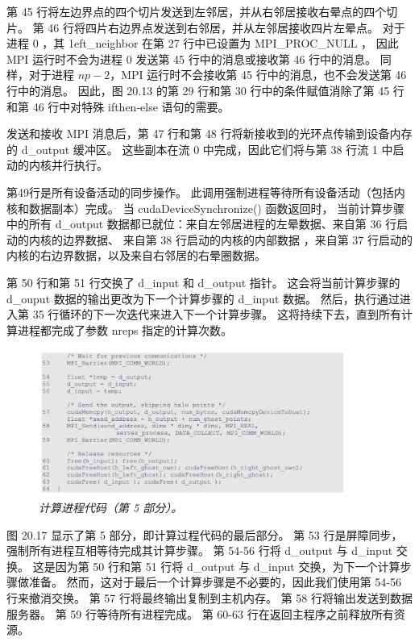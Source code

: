 第 45 行将左边界点的四个切片发送到左邻居，并从右邻居接收右晕点的四个切片。 
第 46 行将四片右边界点发送到右邻居，并从左邻居接收四片左晕点。 
对于进程 0 ，其 1eft\_neighbor 在第 27 行中已设置为 MPI\_PROC\_NULL ，
因此 MPI 运行时不会为进程 0 发送第 45 行中的消息或接收第 46 行中的消息。 
同样，对于进程 $n p-2$，MPI 运行时不会接收第 45 行中的消息，也不会发送第 46 行中的消息。 
因此，图 20.13 的第 29 行和第 30 行中的条件赋值消除了第 45 行和第 46 行中对特殊 ifthen-else 语句的需要。

发送和接收 MPI 消息后，第 47 行和第 48 行将新接收到的光环点传输到设备内存的 d\_output 缓冲区。 
这些副本在流 0 中完成，因此它们将与第 38 行流 1 中启动的内核并行执行。

第49行是所有设备活动的同步操作。 此调用强制进程等待所有设备活动（包括内核和数据副本）完成。 
当 cudaDeviceSynchronize() 函数返回时，
当前计算步骤中的所有 d\_output 数据都已就位：来自左邻居进程的左晕数据、来自第 36 行启动的内核的边界数据、
来自第 38 行启动的内核的内部数据 ，来自第 37 行启动的内核的右边界数据，以及来自右邻居的右晕圈数据。

第 50 行和第 51 行交换了 d\_input 和 d\_output 指针。 
这会将当前计算步骤的 d\_ouput 数据的输出更改为下一个计算步骤的 d\_input 数据。 
然后，执行通过进入第 35 行循环的下一次迭代来进入下一个计算步骤。 
这将持续下去，直到所有计算进程都完成了参数 nreps 指定的计算次数。

\begin{figure}[H]
	\centering
	\includegraphics[width=0.9\textwidth]{figs/F20.17.png}
	\caption{\textit{计算进程代码（第 5 部分）。}}
\end{figure}

图 20.17 显示了第 5 部分，即计算过程代码的最后部分。 第 53 行是屏障同步，强制所有进程互相等待完成其计算步骤。 
第 54-56 行将 d\_output 与 d\_input 交换。 
这是因为第 50 行和第 51 行将 d\_output 与 d\_input 交换，为下一个计算步骤做准备。 
然而，这对于最后一个计算步骤是不必要的，因此我们使用第 54-56 行来撤消交换。 第 57 行将最终输出复制到主机内存。 
第 58 行将输出发送到数据服务器。 第 59 行等待所有进程完成。 第 60-63 行在返回主程序之前释放所有资源。

